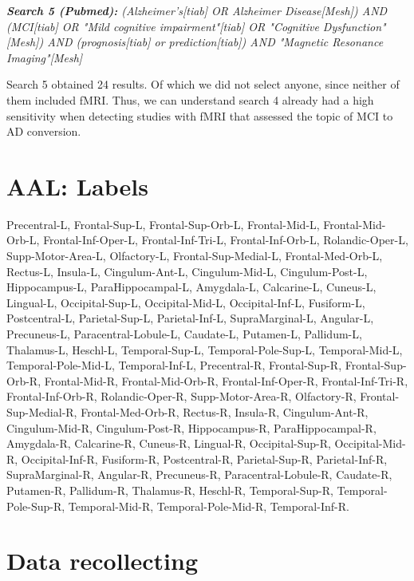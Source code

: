 	\noindent \textit{\textbf{Search 5 (Pubmed):} (Alzheimer's[tiab] OR Alzheimer Disease[Mesh]) AND (MCI[tiab] OR "Mild cognitive impairment"[tiab] OR "Cognitive Dysfunction"[Mesh]) AND (prognosis[tiab] or prediction[tiab]) AND "Magnetic Resonance Imaging"[Mesh]}
	
	
	Search 5 obtained 24 results. Of which we did not select anyone, since neither of them included fMRI. Thus, we can understand search 4 already had a high sensitivity when detecting studies with fMRI that assessed the topic of MCI to AD conversion.



\section{AAL: Labels} \label{AAL_annex}

Precentral-L, Frontal-Sup-L, Frontal-Sup-Orb-L, Frontal-Mid-L, Frontal-Mid-Orb-L, Frontal-Inf-Oper-L, Frontal-Inf-Tri-L, Frontal-Inf-Orb-L, Rolandic-Oper-L, Supp-Motor-Area-L, Olfactory-L, Frontal-Sup-Medial-L, Frontal-Med-Orb-L, Rectus-L, Insula-L, Cingulum-Ant-L, Cingulum-Mid-L, Cingulum-Post-L, Hippocampus-L, ParaHippocampal-L, Amygdala-L, Calcarine-L, Cuneus-L, Lingual-L, Occipital-Sup-L, Occipital-Mid-L, Occipital-Inf-L, Fusiform-L, Postcentral-L, Parietal-Sup-L, Parietal-Inf-L, SupraMarginal-L, Angular-L, Precuneus-L, Paracentral-Lobule-L, Caudate-L, Putamen-L, Pallidum-L, Thalamus-L, Heschl-L, Temporal-Sup-L, Temporal-Pole-Sup-L, Temporal-Mid-L, Temporal-Pole-Mid-L, Temporal-Inf-L, Precentral-R, Frontal-Sup-R, Frontal-Sup-Orb-R, Frontal-Mid-R, Frontal-Mid-Orb-R, Frontal-Inf-Oper-R, Frontal-Inf-Tri-R, Frontal-Inf-Orb-R, Rolandic-Oper-R, Supp-Motor-Area-R, Olfactory-R, Frontal-Sup-Medial-R, Frontal-Med-Orb-R, Rectus-R, Insula-R, Cingulum-Ant-R, Cingulum-Mid-R, Cingulum-Post-R, Hippocampus-R, ParaHippocampal-R, Amygdala-R, Calcarine-R, Cuneus-R, Lingual-R, Occipital-Sup-R, Occipital-Mid-R, Occipital-Inf-R, Fusiform-R, Postcentral-R, Parietal-Sup-R, Parietal-Inf-R, SupraMarginal-R, Angular-R, Precuneus-R, Paracentral-Lobule-R, Caudate-R, Putamen-R, Pallidum-R, Thalamus-R, Heschl-R, Temporal-Sup-R, Temporal-Pole-Sup-R, Temporal-Mid-R, Temporal-Pole-Mid-R, Temporal-Inf-R.








\section{Data recollecting}
